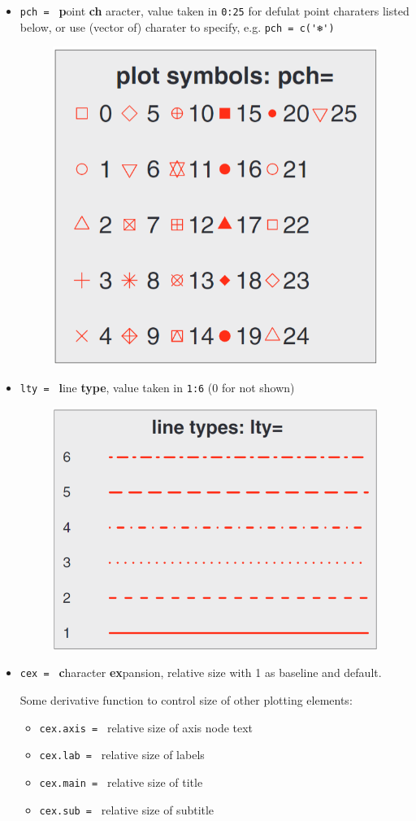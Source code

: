 \begin{itemize}[topsep=2pt,itemsep=0pt]
\begin{itemize}[topsep=2pt,itemsep=0pt]
        \item \lstinline|pch = | \textbf{p}oint \textbf{ch} aracter, value taken in \lstinline|0:25| for defulat point charaters listed below, or use (vector of) charater to specify, e.g. \lstinline|pch = c('❄')|
        \begin{figure}[H]
            \centering
            \includegraphics[width=0.3\linewidth]{sections/images/2022-08-18-11-14-15.png}

            \label{}
        \end{figure}

        \item \lstinline|lty = | \textbf{l}ine \textbf{type}, value taken in \lstinline|1:6| (0 for not shown)
        \begin{figure}[H]
            \centering
            \includegraphics[width=0.4\linewidth]{sections/images/2022-08-18-11-15-34.png}

            \label{}
        \end{figure}

        \item \lstinline|cex = | \textbf{c}haracter \textbf{ex}pansion, relative size with 1 as baseline and default. 
        
        Some derivative function to control size of other plotting elements:
        \begin{itemize}[topsep=2pt,itemsep=0pt]
            \item \lstinline|cex.axis = | relative size of axis node text
            \item \lstinline|cex.lab = | relative size of labels
            \item \lstinline|cex.main = | relative size of title 
            \item \lstinline|cex.sub = | relative size of subtitle 
        \end{itemize}
        

\end{itemize}
\end{itemize}
